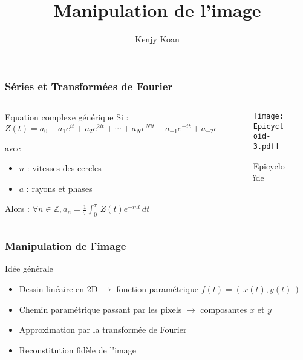\documentclass[aspectratio=169]{beamer}
\begin{document}
  \begin{frame}
\frametitle{Séries et Transformées de Fourier }
\begin{columns}
\begin{column}{0.5\textwidth}

\begin{block}{Equation complexe générique}
Si : $Z(t) = a_{0} + a_{1} e^{it} + a_{2} e^{2it} + \cdots +a_{N} e^{Nit} + a_{-1} e^{-it} + a_{-2} e^{-2it} + \cdots +a_{-N} e^{-Nit}$

avec \begin{itemize}
    \item  $n$ : vitesses des cercles
    \item $a$ : rayons et phases
\end{itemize} 

Alors : $\forall n \in \mathbb{Z}, a_{n} = \frac{1}{\tau} \int_{0}^{\tau} \, Z(t) e^{-int} \, dt$
  
\end{block}

\end{column}
\begin{column}{0.5\textwidth}  %
\begin{figure}
    \centering
            \texttt{[image: Epicycloid-3.pdf]}
            \caption{Epicycloïde}
            \end{figure}

\end{column}
\end{columns}
\end{frame}

\author{Kenjy Koan}
\title[Présentation du Projet de Développement Logiciel]{Manipulation de l'image }

\begin{frame}
    \titlepage
    \vspace{-10pt}
\end{frame}

\begin{frame}
\frametitle{Manipulation de l'image }
\begin{block}{Idée générale}
  \begin{itemize}
      \item Dessin linéaire en 2D $\rightarrow$ fonction paramétrique $f(t) = (\, x(t), y(t) \,)$
      \item Chemin paramétrique passant par les pixels $\rightarrow$ composantes $x$ et $y$
      \item Approximation par la transformée de Fourier \item Reconstitution fidèle de l'image
  \end{itemize}
  \end{block}
\end{frame}
\end{document}
